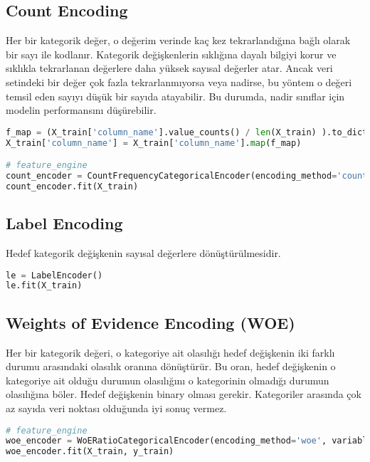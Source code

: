 \subsection{Count Encoding}
Her bir kategorik değer, o değerim verinde kaç kez tekrarlandığına bağlı olarak bir sayı ile kodlanır. Kategorik değişkenlerin sıklığına dayalı bilgiyi korur ve sıklıkla tekrarlanan değerlere daha yüksek sayısal değerler atar. Ancak veri setindeki bir değer çok fazla tekrarlanmıyorsa veya nadirse, bu yöntem o değeri temsil eden sayıyı düşük bir sayıda atayabilir. Bu durumda, nadir sınıflar için modelin performansını düşürebilir.

\begin{lstlisting}[language=Python, caption=Scikit-learn'de CountEncoding örneği.]
f_map = (X_train['column_name'].value_counts() / len(X_train) ).to_dict()
X_train['column_name'] = X_train['column_name'].map(f_map)

# feature_engine
count_encoder = CountFrequencyCategoricalEncoder(encoding_method='count', variables=None)
count_encoder.fit(X_train)
\end{lstlisting}

\subsection{Label Encoding}
Hedef kategorik değişkenin sayısal değerlere dönüştürülmesidir.

\begin{lstlisting}[language=Python, caption=Scikit-learn'de LabelEncoding örneği.]
le = LabelEncoder()
le.fit(X_train)
\end{lstlisting}

\subsection{Weights of Evidence Encoding (WOE)}
Her bir kategorik değeri, o kategoriye ait olasılığı hedef değişkenin iki farklı durumu arasındaki olasılık oranına dönüştürür. Bu oran, hedef değişkenin o kategoriye ait olduğu durumun olasılığını o kategorinin olmadığı durumun olasılığına böler. Hedef değişkenin binary olması gerekir. Kategoriler arasında çok az sayıda veri noktası olduğunda iyi sonuç vermez.

\begin{lstlisting}[language=Python, caption=Scikit-learn'de WOE örneği.]
# feature_engine
woe_encoder = WoERatioCategoricalEncoder(encoding_method='woe', variables=['column_name'])
woe_encoder.fit(X_train, y_train)
\end{lstlisting}

